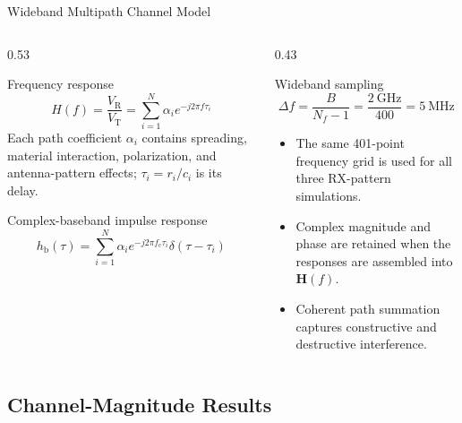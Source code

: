 \begin{frame}[t,shrink=22]{Wideband Multipath Channel Model}
    \begin{columns}[T,onlytextwidth]
        \begin{column}{0.53\textwidth}
            \begin{block}{Frequency response}
                \[
                    H(f)=\frac{V_{\mathrm R}}{V_{\mathrm T}}
                    =\sum_{i=1}^{N}\alpha_i e^{-j2\pi f\tau_i}
                \]
                \small
                Each path coefficient $\alpha_i$ contains spreading,
                material interaction, polarization, and antenna-pattern
                effects; $\tau_i=r_i/c_i$ is its delay.
            \end{block}

            \begin{block}{Complex-baseband impulse response}
                \[
                    h_{\mathrm b}(\tau)=
                    \sum_{i=1}^{N}
                    \alpha_i e^{-j2\pi f_{\mathrm c}\tau_i}
                    \delta(\tau-\tau_i)
                \]
            \end{block}
        \end{column}
        \begin{column}{0.43\textwidth}
            \begin{block}{Wideband sampling}
                \[
                    \Delta f=\frac{B}{N_f-1}
                    =\frac{2~\mathrm{GHz}}{400}
                    =5~\mathrm{MHz}
                \]
            \end{block}

            \begin{itemize}
                \item The same 401-point frequency grid is used for all three
                RX-pattern simulations.
                \item Complex magnitude and phase are retained when the
                responses are assembled into $\mathbf H(f)$.
                \item Coherent path summation captures constructive and
                destructive interference.
            \end{itemize}
        \end{column}
    \end{columns}
\end{frame}

\subsection{Channel-Magnitude Results}

